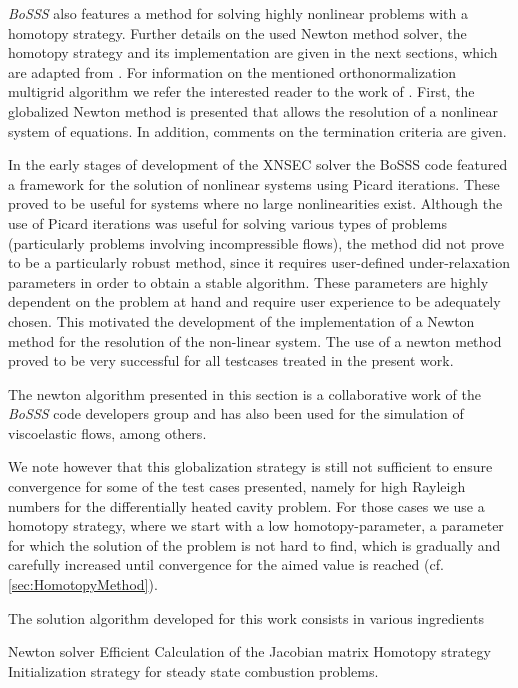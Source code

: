 \textit{BoSSS} also features a method for solving highly nonlinear problems with a homotopy strategy.
Further details on the used Newton method solver, the homotopy strategy and its implementation are given in the next sections, which are adapted from \textcite{kikkerFullyCoupledHighorder}. For information on the mentioned orthonormalization multigrid algorithm we refer the interested reader to the work of \textcite{kummerBoSSSPackageMultigrid2021}.
First, the globalized Newton method is presented that allows the resolution of a nonlinear system of equations. In addition, comments on the termination criteria are given.


In the early stages of development of the XNSEC solver the BoSSS code featured a framework for the solution of nonlinear systems using Picard iterations. These proved to be useful for systems where no large nonlinearities exist. Although the use of Picard iterations was useful for solving various types of problems (particularly problems involving incompressible flows), the method did not prove to be a particularly robust method, since it requires user-defined under-relaxation parameters in order to obtain a stable algorithm. These parameters are highly dependent on the problem at hand and require user experience to be adequately chosen.
This motivated the development of the implementation of a Newton method for the resolution of the non-linear system. The use of a newton method proved to be very successful for all testcases treated in the present work. 

The newton algorithm presented in this section is a collaborative work of the \textit{BoSSS}  code developers group and has also been used for the simulation of viscoelastic \parencite{kikkerFullyCoupledHighorder} flows, among others.


We note however that this globalization strategy is still not sufficient to ensure convergence for some of the test cases presented, namely for high Rayleigh numbers for the differentially heated cavity problem. For those cases we use a homotopy strategy, where we start with a low homotopy-parameter, a parameter for which the solution of the problem is not hard to find, which is gradually and carefully increased until convergence for the aimed value is reached (cf. \cref{sec:HomotopyMethod}).




The solution algorithm developed for this work consists in various ingredients

Newton solver
Efficient Calculation of the Jacobian matrix
Homotopy strategy
Initialization strategy for steady state combustion problems.
